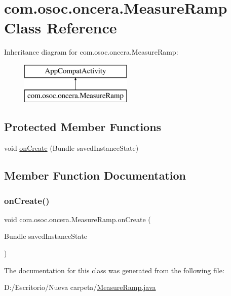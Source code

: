 \hypertarget{classcom_1_1osoc_1_1oncera_1_1_measure_ramp}{}\section{com.\+osoc.\+oncera.\+Measure\+Ramp Class Reference}
\label{classcom_1_1osoc_1_1oncera_1_1_measure_ramp}
Inheritance diagram for com.\+osoc.\+oncera.\+Measure\+Ramp\+:\begin{figure}[H]
\begin{center}
\leavevmode
\includegraphics[height=2.000000cm]{classcom_1_1osoc_1_1oncera_1_1_measure_ramp}
\end{center}
\end{figure}
\subsection*{Protected Member Functions}
\begin{DoxyCompactItemize}
\item 
void \mbox{\hyperlink{classcom_1_1osoc_1_1oncera_1_1_measure_ramp_aa297be6b27f0e4d967eff56953327d6d}{on\+Create}} (Bundle saved\+Instance\+State)
\end{DoxyCompactItemize}


\subsection{Member Function Documentation}
\mbox{\label{classcom_1_1osoc_1_1oncera_1_1_measure_ramp_aa297be6b27f0e4d967eff56953327d6d}} 
\subsubsection{\texorpdfstring{onCreate()}{onCreate()}}
{\footnotesize\ttfamily void com.\+osoc.\+oncera.\+Measure\+Ramp.\+on\+Create (\begin{DoxyParamCaption}\item[{Bundle}]{saved\+Instance\+State }\end{DoxyParamCaption})\hspace{0.3cm}{\ttfamily [protected]}}



The documentation for this class was generated from the following file\+:\begin{DoxyCompactItemize}
\item 
D\+:/\+Escritorio/\+Nueva carpeta/\mbox{\hyperlink{_measure_ramp_8java}{Measure\+Ramp.\+java}}\end{DoxyCompactItemize}
